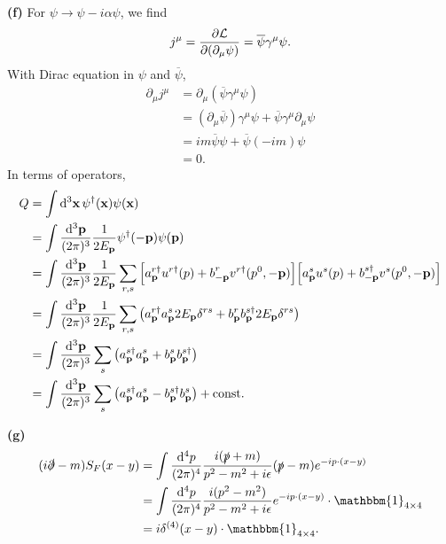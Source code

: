 \documentclass{article}
\makeatletter
\newcommand*{\shifttext}[1]{%
  \settowidth{\@tempdima}{#1}%
  \hspace{-\@tempdima}#1%
}
\newcommand{\plabel}[1]{%
\shifttext{\textbf{#1}\quad}%
}
\newcommand{\minusbaseline}{\abovedisplayskip=0pt\abovedisplayshortskip=0pt~\vspace*{-\baselineskip}}%
\makeatother
\begin{document}
\plabel{(f)}%
For $\psi \rightarrow \psi - i\alpha\psi$, we find
\[ j^\mu = \pdv{\mathcal{L}}{(\partial_\mu \psi)} (-i\psi) = \overline{\psi}\gamma^\mu\psi. \]
With Dirac equation in $\psi$ and $\overline{\psi}$,
\begin{align*}
    \partial_\mu j^\mu &= \partial_\mu(\overline{\psi}\gamma^\mu \psi) \\
    &= (\partial_\mu \overline{\psi}) \gamma^\mu \psi + \overline{\psi}\gamma^\mu\partial_\mu\psi \\
    &= im\overline{\psi}\psi + \overline{\psi}(-im)\psi \\
    &= 0.
\end{align*}
In terms of operators,
\begin{align*}
    Q &= \int \dd[3]{\vb{x}} \psi^\dagger(\vb{x}) \psi(\vb{x}) \\
    &= \int \frac{\dd[3]{\vb{p}}}{(2\pi)^3} \frac{1}{{2E_{\vb{p}}}} \psi^\dagger(-\vb{p})\psi(\vb{p}) \\
    &= \int \frac{\dd[3]{\vb{p}}}{(2\pi)^3} \frac{1}{{2E_{\vb{p}}}} \sum_{r,s}\qty[a^{r\dagger}_{\vb{p}} u^{r\dagger}(p) + b^{r\vphantom{\dagger}}_{-\vb{p}} v^{r\dagger}(p^0,-\vb{p})]\qty[a^{s}_{\vb{p}} u^{s}(p) + b^{s\dagger}_{-\vb{p}} v^{s}(p^0,-\vb{p})] \\
    &= \int \frac{\dd[3]{\vb{p}}}{(2\pi)^3} \frac{1}{{2E_{\vb{p}}}} \sum_{r,s}\qty(a^{r\dagger}_{\vb{p}} a^s_{\vb{p}} 2E_{\vb{p}} \delta^{rs} + b^{r}_{\vb{p}} b^{s\dagger}_{\vb{p}} 2E_{\vb{p}} \delta^{rs}) \\
    &= \int \frac{\dd[3]{\vb{p}}}{(2\pi)^3} \sum_{s}\qty(a^{s\dagger}_{\vb{p}} a^s_{\vb{p}}  + b^{s}_{\vb{p}} b^{s\dagger}_{\vb{p}}) \\
    &= \int \frac{\dd[3]{\vb{p}}}{(2\pi)^3} \sum_{s}\qty(a^{s\dagger}_{\vb{p}} a^s_{\vb{p}}  - b^{s\dagger}_{\vb{p}} b^{s}_{\vb{p}}) + \mathrm{const}.
\end{align*}

\plabel{(g)}%
\begingroup\minusbaseline%
\begin{align*}
    (i\slashed{\partial} - m)S_F(x-y) &= \int \frac{\dd[4]{p}}{(2\pi)^4} \frac{i(\slashed{p}+m)}{p^2 - m^2 + i\epsilon} (\slashed{p} - m) e^{-ip\cdot (x-y)} \\
    &= \int \frac{\dd[4]{p}}{(2\pi)^4} \frac{i(p^2 - m^2)}{p^2 - m^2 + i\epsilon} e^{-ip\cdot (x-y)}  \cdot \mathbbm{1}_{4\times 4}  \\
    &= i\delta^{(4)}(x-y) \cdot \mathbbm{1}_{4\times 4}.
\end{align*}
\endgroup
\end{document}
